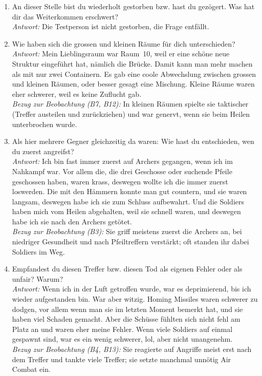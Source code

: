 \documentclass[../Main.tex]{subfiles}
\begin{document}
\begin{enumerate}[label=\textbf{I\arabic*}, leftmargin=1.5cm, itemsep=1em]
\item An dieser Stelle bist du wiederholt gestorben bzw. hast du gezögert. Was hat dir das Weiterkommen erschwert? \\
\textit{Antwort:} Die Testperson ist nicht gestorben, die Frage entfällt.

\item Wie haben sich die grossen und kleinen Räume für dich unterschieden? \\
\textit{Antwort:} Mein Lieblingsraum war Raum~10, weil er eine schöne neue Struktur eingeführt hat, nämlich die Brücke. Damit kann man mehr machen als mit nur zwei Containern. Es gab eine coole Abwechslung zwischen grossen und kleinen Räumen, oder besser gesagt eine Mischung. Kleine Räume waren eher schwerer, weil es keine Zuflucht gab. \\
\textit{Bezug zur Beobachtung (B7, B12):} In kleinen Räumen spielte sie taktischer (Treffer austeilen und zurückziehen) und war genervt, wenn sie beim Heilen unterbrochen wurde.

\item Als hier mehrere Gegner gleichzeitig da waren: Wie hast du entschieden, wen du zuerst angreifst? \\
\textit{Antwort:} Ich bin fast immer zuerst auf Archers gegangen, wenn ich im Nahkampf war. Vor allem die, die drei Geschosse oder suchende Pfeile geschossen haben, waren krass, deswegen wollte ich die immer zuerst loswerden. Die mit den Hämmern konnte man gut countern, und sie waren langsam, deswegen habe ich sie zum Schluss aufbewahrt. Und die Soldiers haben mich vom Heilen abgehalten, weil sie schnell waren, und deswegen habe ich sie nach den Archers getötet. \\
\textit{Bezug zur Beobachtung (B3):} Sie griff meistens zuerst die Archers an, bei niedriger Gesundheit und nach Pfeiltreffern verstärkt; oft standen ihr dabei Soldiers im Weg.

\item Empfandest du diesen Treffer bzw. diesen Tod als eigenen Fehler oder als unfair? Warum? \\
\textit{Antwort:} Wenn ich in der Luft getroffen wurde, war es deprimierend, bis ich wieder aufgestanden bin. War aber witzig. Homing Missiles waren schwerer zu dodgen, vor allem wenn man sie im letzten Moment bemerkt hat, und sie haben viel Schaden gemacht. Aber die Schüsse fühlten sich nicht fehl am Platz an und waren eher meine Fehler. Wenn viele Soldiers auf einmal gespawnt sind, war es ein wenig schwerer, lol, aber nicht unangenehm. \\
\textit{Bezug zur Beobachtung (B4, B13):} Sie reagierte auf Angriffe meist erst nach dem Treffer und tankte viele Treffer; sie setzte manchmal unnötig Air Combat ein.


\end{enumerate}
\end{document}
